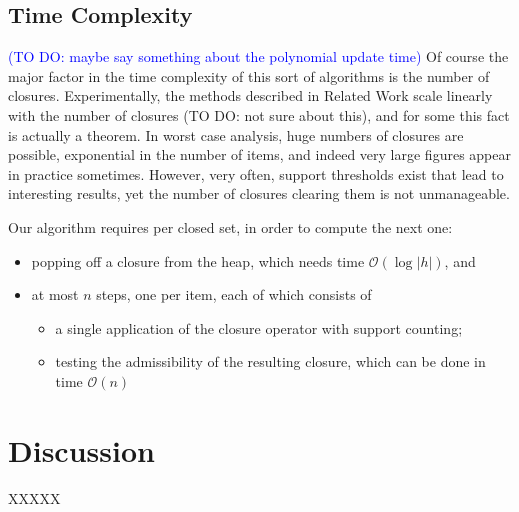 \documentclass{article}
\newcommand{\added}[1]{\textcolor{blue}{#1}}
\begin{document}
\subsection{Time Complexity}\label{sec:Compl}
\added{(TO DO: maybe say something about the polynomial update time)}
Of course the major factor in the time complexity of 
this sort of algorithms is the number of closures. 
Experimentally, the methods described in Related Work 
scale linearly with the number of closures (TO DO: not sure about this), and
for some this fact is actually a theorem. In worst
case analysis, huge numbers of closures are possible, 
exponential in the number of items, and indeed very 
large figures appear in practice sometimes. However,
very often, support thresholds exist that lead to 
interesting results, yet the number of closures 
clearing them is not unmanageable.

Our algorithm requires per closed set, in order to compute the next one:
\begin{itemize}
\item popping off a closure from the heap,
which needs time $\mathcal{O}(\log|h|)$, and
\item at most $n$ steps, one per item, each of which consists of
\begin{itemize}
\item a single application of the closure operator with support counting;
\item testing the admissibility of the resulting closure, which can be done in time $\mathcal{O}(n)$ 
\end{itemize}
\end{itemize}

\section{Discussion}\label{sec:discuss}

XXXXX




\end{document}
